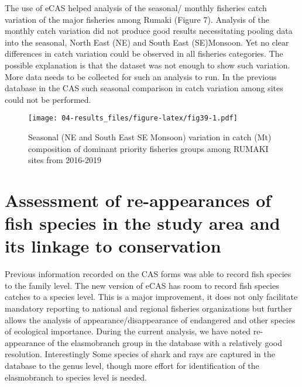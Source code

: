 \documentclass[
  12pt,
  a4paper,
  oneside]{book}
\begin{document}
The use of eCAS helped analysis of the seasonal/ monthly fisheries catch variation of the major fisheries among Rumaki (Figure 7). Analysis of the monthly catch variation did not produce good results necessitating pooling data into the seasonal, North East (NE) and South East (SE)Monsoon. Yet no clear differences in catch variation could be observed in all fisheries categories. The possible explanation is that the dataset was not enough to show such variation. More data needs to be collected for such an analysis to run. In the previous database in the CAS such seasonal comparison in catch variation among sites could not be performed.

\begin{figure}
\centering
\texttt{[image: 04-results\_files/figure-latex/fig39-1.pdf]}
\caption{\label{fig:fig39}Seasonal (NE and South East SE Monsoon) variation in catch (Mt) composition of dominant priority fisheries groups among RUMAKI sites from 2016-2019}
\end{figure}

\hypertarget{assessment-of-re-appearances-of-fish-species-in-the-study-area-and-its-linkage-to-conservation}{%
\section{Assessment of re-appearances of fish species in the study area and its linkage to conservation}\label{assessment-of-re-appearances-of-fish-species-in-the-study-area-and-its-linkage-to-conservation}}

Previous information recorded on the CAS forms was able to record fish species to the family level. The new version of eCAS has room to record fish species catches to a species level. This is a major improvement, it does not only facilitate mandatory reporting to national and regional fisheries organizations but further allows the analysis of appearance/disappearance of endangered and other species of ecological importance. During the current analysis, we have noted re-appearance of the elasmobranch group in the database with a relatively good resolution. Interestingly Some species of shark and rays are captured in the database to the genus level, though more effort for identification of the elasmobranch to species level is needed.

\end{document}
